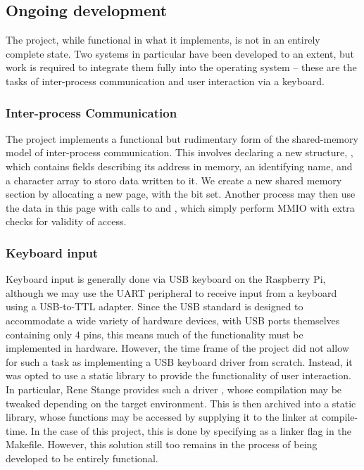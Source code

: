 \subsection{Ongoing development}
    The project, while functional in what it implements, is not in an entirely
    complete state. Two systems in particular have been developed to an extent,
    but work is required to integrate them fully into the operating system --
    these are the tasks of inter-process communication and user interaction via
    a keyboard.

    \subsubsection{Inter-process Communication}
        The project implements a functional but rudimentary form of the
        shared-memory model of inter-process communication. This involves
        declaring a new structure, , which contains
        fields describing its address in memory, an identifying name, and a
        character array to storo data written to it. We create a new shared
        memory section by allocating a new page, with the  bit set.
        Another process may then use the data in this page with calls to
         and , which simply perform MMIO
        with extra checks for validity of access.

    \subsubsection{Keyboard input}
        \label{StaticLibrary}
        Keyboard input is generally done via USB keyboard on the Raspberry Pi,
        although we may use the UART peripheral to receive input from a keyboard
        using a USB-to-TTL adapter. Since the USB standard is designed to
        accommodate a wide variety of hardware devices, with USB ports
        themselves containing only 4 pins, this means much of the functionality
        must be implemented in hardware. However, the time frame of the project
        did not allow for such a task as implementing a USB keyboard driver from
        scratch. Instead, it was opted to use a static library to provide the
        functionality of user interaction. In particular, Rene Stange provides
        such a driver \cite{USPi}, whose compilation may be tweaked depending on
        the target environment. This is then archived into a static library,
        whose functions may be accessed by supplying it to the linker at
        compile-time. In the case of this project, this is done by specifying
         as a linker flag in the Makefile. However, this solution
        still too remains in the process of being developed to be entirely
        functional.
